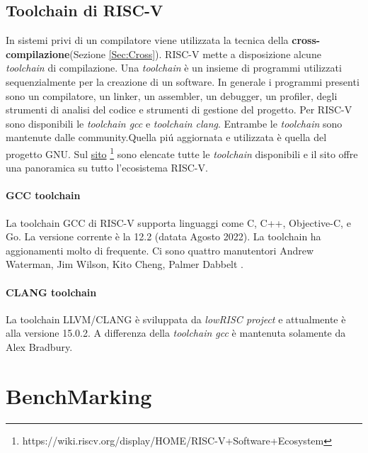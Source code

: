 \documentclass[12pt, a4paper]{report}
\begin{document}
\section{Toolchain di RISC-V}
In sistemi privi di un compilatore viene utilizzata la tecnica della \textbf{cross-compilazione}(Sezione \ref{Sec:Cross}). RISC-V mette a disposizione alcune \textit{toolchain} di compilazione. Una \textit{toolchain} è un insieme di programmi utilizzati sequenzialmente per la creazione di un software. In generale i programmi presenti sono un compilatore, un linker, un assembler, un debugger, un profiler, degli strumenti di analisi del codice e strumenti di gestione del progetto. Per RISC-V sono disponibili le \textit{toolchain gcc}\cite{toolchain_gcc} e \textit{toolchain clang}\cite{toolchain_clang}. Entrambe le \textit{toolchain} sono mantenute dalle community.Quella pi\'u aggiornata e utilizzata è quella del progetto GNU. Sul \href{https://wiki.riscv.org/display/HOME/RISC-V+Software+Ecosystem}{sito} \footnote{https://wiki.riscv.org/display/HOME/RISC-V+Software+Ecosystem} sono elencate tutte le \textit{toolchain} disponibili e il sito offre una panoramica su tutto l'ecosistema RISC-V.


\subsubsection{GCC toolchain}
La toolchain GCC di RISC-V supporta linguaggi come C, C++, Objective-C, e Go. La versione corrente è la 12.2 (datata Agosto 2022). La toolchain ha aggionamenti molto di frequente. Ci sono quattro manutentori Andrew Waterman, Jim Wilson, Kito Cheng, Palmer Dabbelt .

\subsubsection{CLANG toolchain}
La toolchain LLVM/CLANG è sviluppata da \textit{lowRISC project} e attualmente è alla versione 15.0.2. A differenza della \textit{toolchain gcc} è mantenuta solamente da Alex Bradbury.



\chapter{BenchMarking}
\end{document}
